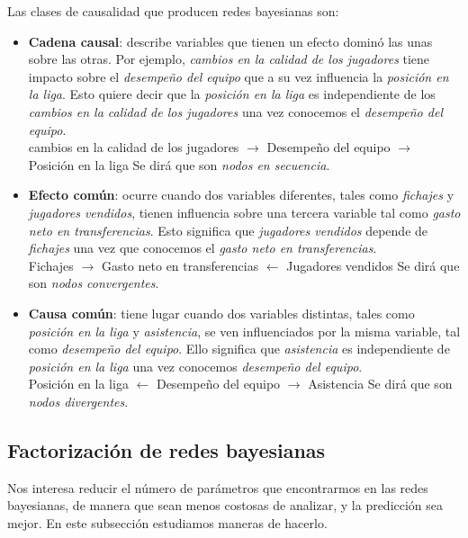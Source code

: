 Las clases de causalidad que producen redes bayesianas son:
\begin{itemize}
    \item \textbf{Cadena causal}: describe variables que tienen un efecto dominó las unas sobre las otras. 
    Por ejemplo, \textit{cambios en la calidad de los jugadores} tiene impacto sobre el \textit{desempeño 
    del equipo} que a su vez influencia la \textit{posición en la liga}. 
    Esto quiere decir que la \textit{posición en la liga} es independiente de los \textit{cambios en la 
    calidad de los jugadores} una vez conocemos el \textit{desempeño del equipo}.\\
    cambios en la calidad de los jugadores $\rightarrow$ Desempeño del equipo $\rightarrow$ Posición en la 
    liga
    Se dirá que son {\em nodos en secuencia}. \label{nodos-secuencia}
    \item \textbf{Efecto común}: ocurre cuando dos variables diferentes, tales como \textit{fichajes} y \textit{jugadores vendidos}, tienen influencia sobre una tercera variable tal como 
    \textit{gasto neto en transferencias}. Esto significa que \textit{jugadores vendidos} depende de \textit{fichajes} una vez que conocemos el \textit{gasto neto en transferencias}.\\
    Fichajes $\rightarrow$ Gasto neto en transferencias $\leftarrow$ Jugadores vendidos 
    Se dirá que son {\em nodos convergentes}. \label{nodos-conv}   
    \item \textbf{Causa común}: tiene lugar cuando dos variables distintas, tales como \textit{posición en la liga} y \textit{asistencia}, se ven influenciados por la misma variable, tal 
    como \textit{desempeño del equipo}. Ello significa que \textit{asistencia} es independiente de \textit{posición en la liga} una vez conocemos \textit{desempeño del equipo}.\\
    Posición en la liga $\leftarrow$ Desempeño del equipo $\rightarrow$ Asistencia
    Se dirá que son {\em nodos divergentes}. \label{nodos-div}
\end{itemize}

\subsection{Factorización de redes bayesianas}
Nos interesa reducir el número de parámetros que encontrarmos en las redes bayesianas, de manera que sean menos 
costosas de analizar, y la predicción sea mejor. En este subsección estudiamos maneras de hacerlo.

